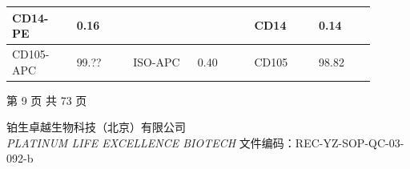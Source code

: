\documentclass[UTF8,10pt,a4paper,fontset=fandol]{ctexart}
\newcommand{\fieldvalue}[1]{#1}
\newcommand{\handwritten}[1]{#1}
\begin{document}
\begin{center}
\begin{tabular}{|p{0.16\linewidth}|p{0.14\linewidth}|p{0.16\linewidth}|p{0.14\linewidth}|p{0.16\linewidth}|p{0.14\linewidth}|}
\hline
CD14-PE &
\fieldvalue{\handwritten{0.16}} &
& &
CD14 &
\fieldvalue{\handwritten{0.14}}\\
\hline
CD105-APC &
\fieldvalue{\handwritten{99.??}} &
ISO-APC &
\fieldvalue{\handwritten{0.40}} &
CD105 &
\fieldvalue{\handwritten{98.82}}\\
\hline
\end{tabular}
\end{center}

\begin{center}
第 9 页 共 73 页
\end{center}

\newpage

\begin{center}
铂生卓越生物科技（北京）有限公司\\
\textit{PLATINUM LIFE EXCELLENCE BIOTECH}
\qquad 文件编码：REC-YZ-SOP-QC-03-092-b
\end{center}
\end{document}
